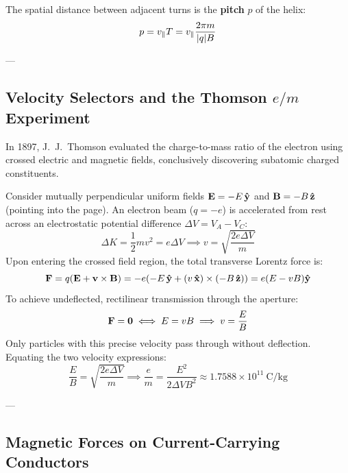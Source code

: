 The spatial distance between adjacent turns is the \textbf{pitch} $p$ of the helix:
\begin{equation}
    p = v_{\parallel} T = v_{\parallel} \frac{2\pi m}{\abs{q} B}
\end{equation}

---

\subsection{Velocity Selectors and the Thomson $e/m$ Experiment}
\label{sec:thomson_experiment}

In 1897, J.~J.~Thomson evaluated the charge-to-mass ratio of the electron using crossed electric and magnetic fields, conclusively discovering subatomic charged constituents.

\begin{example}
Consider mutually perpendicular uniform fields $\vb{E} = -E\,\vu{y}$ and $\vb{B} = -B\,\vu{z}$ (pointing into the page). An electron beam ($q = -e$) is accelerated from rest across an electrostatic potential difference $\Delta V = V_A - V_C$:
\begin{equation}
    \Delta K = \frac{1}{2}m v^2 = e \Delta V \implies v = \sqrt{\frac{2e\Delta V}{m}}
\end{equation}
Upon entering the crossed field region, the total transverse Lorentz force is:
\begin{equation}
    \vb{F} = q\qty(\vb{E} + \vb{v}\times \vb{B}) = -e\qty(-E\,\vu{y} + (v\,\vu{x})\times(-B\,\vu{z})) = e\qty(E - v B)\vu{y}
\end{equation}
To achieve undeflected, rectilinear transmission through the aperture:
\begin{equation}
    \vb{F} = \vb{0} \iff E = v B \implies v = \frac{E}{B}
\end{equation}
Only particles with this precise velocity pass through without deflection. Equating the two velocity expressions:
\begin{equation}
    \frac{E}{B} = \sqrt{\frac{2e\Delta V}{m}} \implies \frac{e}{m} = \frac{E^2}{2 \Delta V B^2} \approx 1.7588 \times 10^{11}\ \mathrm{C/kg}
\end{equation}
\end{example}

---

\subsection{Magnetic Forces on Current-Carrying Conductors}
\label{sec:forces_on_wires}


